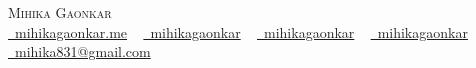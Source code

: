 \documentclass[10pt]{article}
\begin{document}




\begin{center}
    {\HUGE \scshape Mihika Gaonkar} \\ \vspace{1pt}
    \large
    \faGlobe \href{https://mihikagaonkar.me}{\raisebox{-0.1\height}\ mihikagaonkar.me} ~
    \faGithub \href{https://github.com/mihikagaonkar}{\raisebox{-0.2\height}\ mihikagaonkar} ~
    \faLinkedin \href{https://linkedin.com/in/mihikagaonkar}{\raisebox{-0.2\height}\ mihikagaonkar} ~
    \faMedium \href{https://medium.com/@mihikagaonkar}{\raisebox{-0.2\height}\ mihikagaonkar} ~
    \faEnvelope \href{mailto:mihika831@gmail.com}{\raisebox{-0.2\height}\  mihika831@gmail.com}
    \vspace{-13pt}
\end{center}
    
\end{document}
